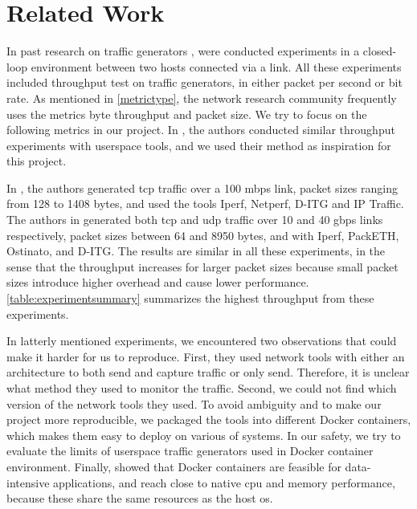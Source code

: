 \chapter{Related Work}\label{relatedwork}

In past research on traffic generators \cite{botta2010you, turull2016pktgen, kolahi2011performance, srivastava2014evaluation, srivastava2014comparative}, were conducted experiments in a closed-loop environment between two hosts connected via a link.
All these experiments included throughput test on traffic generators, in either packet per second or bit rate.
As mentioned in \cref{metrictype}, the network research community frequently uses the metrics byte throughput and packet size.
We try to focus on the following metrics in our project.
In \cite{kolahi2011performance, srivastava2014evaluation, srivastava2014comparative}, the authors conducted similar throughput experiments with userspace tools, and we used their method as inspiration for this project.

\skippara In \cite{kolahi2011performance}, the authors generated \acrshort{tcp} traffic over a 100 \acrshort{mbps} link, packet sizes ranging from 128 to 1408 bytes, and used the tools Iperf, Netperf, D-ITG and IP Traffic.
The authors in \cite{srivastava2014evaluation, srivastava2014comparative} generated both \acrshort{tcp} and \acrshort{udp} traffic over 10 and 40 \acrshort{gbps} links respectively, packet sizes between 64 and 8950 bytes, and with Iperf, PackETH, Ostinato, and D-ITG.
The results are similar in all these experiments, in the sense that the throughput increases for larger packet sizes because small packet sizes introduce higher overhead and cause lower performance.
\cref{table:experimentsummary} summarizes the highest throughput from these experiments.



\skippara In latterly mentioned experiments, we encountered two observations that could make it harder for us to reproduce.
First, they used network tools with either an architecture to both send and capture traffic or only send.
Therefore, it is unclear what method they used to monitor the traffic.
Second, we could not find which version of the network tools they used.
To avoid ambiguity and to make our project more reproducible, we packaged the tools into different Docker containers, which makes them easy to deploy on various of systems.
In our safety, we try to evaluate the limits of userspace traffic generators used in Docker container environment.
Finally, \cite{felter2015updated, chung2016using} showed that Docker containers are feasible for data-intensive applications, and reach close to native \acrshort{cpu} and memory performance, because these share the same resources as the host \acrshort{os}.


